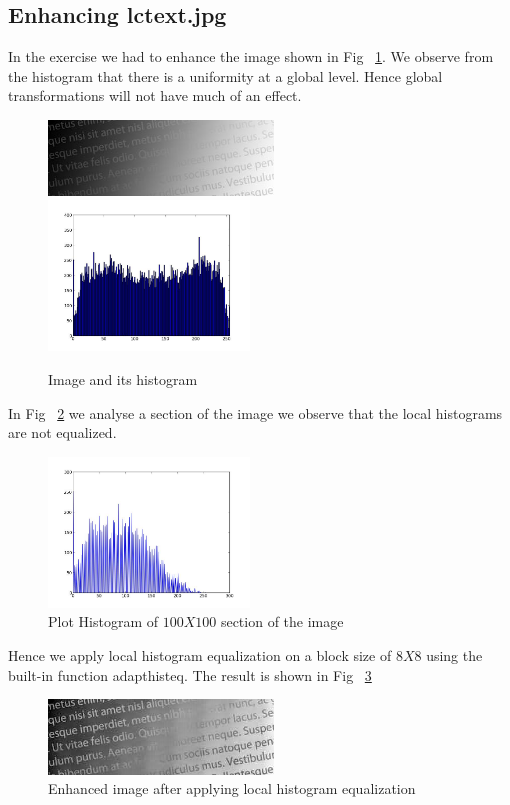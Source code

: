 \documentclass[paper=a4, fontsize=11pt]{scrartcl} %
\numberwithin{equation}{section} %
\numberwithin{figure}{section} %
\numberwithin{table}{section} %
\begin{document}
\subsection{Enhancing lctext.jpg}
    In the exercise we had to enhance the image shown in Fig ~\ref{fig:lctext}. We observe from the histogram that there is a uniformity at a global level. Hence global transformations will not have much of an effect.
        \begin{figure}[h!]
            \centering
            \includegraphics[clip,height=2cm]{lctext}
            \includegraphics[clip,height=4cm]{lctexthist}
            \caption{Image and its histogram}
            \label{fig:lctext}
        \end{figure}
        In Fig ~\ref{fig:lctextlefthist} we analyse a section of the image we observe that the local histograms are not equalized. 
        \begin{figure}[h!]
            \centering
            \includegraphics[clip,height=4cm]{lctextlefthist}
            \caption{Plot Histogram of \(100X100\) section of the image}
            \label{fig:lctextlefthist}
        \end{figure}

        Hence we apply local histogram equalization on a block size of \(8X8\) using the built-in function adapthisteq. The result is shown in Fig ~\ref{fig:lctextenhanced}
        \begin{figure}[h!]
            \centering
            \includegraphics[clip,height=2cm]{lctextenhanced}
            \caption{Enhanced image after applying local histogram equalization}
            \label{fig:lctextenhanced}
        \end{figure}
\end{document}
